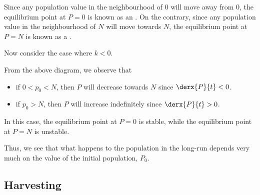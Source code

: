 Since any population value in the neighbourhood of 0 will move away from 0, the equilibrium point at $P = 0$ is known as an . On the contrary, since any population value in the neighbourhood of $N$ will move towards $N$, the equilibrium point at $P = N$ is known as a .

Now consider the case where $k < 0$.

\begin{figure}[H]
    \centering
    \caption{}
\end{figure}

From the above diagram, we observe that
\begin{itemize}
    \item if $0 < p_0 < N$, then $P$ will decrease towards $N$ since $\derx{P}{t} < 0$.
    \item if $p_0 > N$, then $P$ will increase indefinitely since $\derx{P}{t} > 0$.
\end{itemize}

In this case, the equilibrium point at $P = 0$ is stable, while the equilibrium point at $P = N$ is unstable.

Thus, we see that what happens to the population in the long-run depends very much on the value of the initial population, $P_0$.

\subsection{Harvesting}

